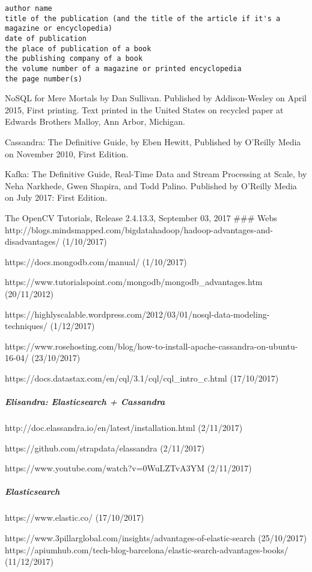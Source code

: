 \documentclass[]{article}
\let\oldsubparagraph\subparagraph
\renewcommand{\subparagraph}[1]{\oldsubparagraph{#1}\mbox{}}
\begin{document}
\begin{verbatim}
author name 
title of the publication (and the title of the article if it's a magazine or encyclopedia) 
date of publication 
the place of publication of a book 
the publishing company of a book 
the volume number of a magazine or printed encyclopedia 
the page number(s) 
\end{verbatim}

NoSQL for Mere Mortals by Dan Sullivan. Published by Addison-Wesley on
April 2015, First printing. Text printed in the United States on
recycled paper at Edwards Brothers Malloy, Ann Arbor, Michigan.

Cassandra: The Definitive Guide, by Eben Hewitt, Published by O'Reilly
Media on November 2010, First Edition.

Kafka: The Definitive Guide, Real-Time Data and Stream Processing at
Scale, by Neha Narkhede, Gwen Shapira, and Todd Palino. Published by
O'Reilly Media on July 2017: First Edition.

The OpenCV Tutorials, Release 2.4.13.3, September 03, 2017 \#\#\# Webs
http://blogs.mindsmapped.com/bigdatahadoop/hadoop-advantages-and-disadvantages/
(1/10/2017)

https://docs.mongodb.com/manual/ (1/10/2017)

https://www.tutorialspoint.com/mongodb/mongodb\_advantages.htm
(20/11/2012)

https://highlyscalable.wordpress.com/2012/03/01/nosql-data-modeling-techniques/
(1/12/2017)

https://www.rosehosting.com/blog/how-to-install-apache-cassandra-on-ubuntu-16-04/
(23/10/2017)

https://docs.datastax.com/en/cql/3.1/cql/cql\_intro\_c.html (17/10/2017)

\hypertarget{elisandra-elasticsearch-cassandra}{%
\subparagraph{Elisandra: Elasticsearch +
Cassandra}\label{elisandra-elasticsearch-cassandra}}

http://doc.elassandra.io/en/latest/installation.html (2/11/2017)

https://github.com/strapdata/elassandra (2/11/2017)

https://www.youtube.com/watch?v=0WuLZTvA3YM (2/11/2017)

\hypertarget{elasticsearch-1}{%
\subparagraph{Elasticsearch}\label{elasticsearch-1}}

https://www.elastic.co/ (17/10/2017)

https://www.3pillarglobal.com/insights/advantages-of-elastic-search
(25/10/2017)
https://apiumhub.com/tech-blog-barcelona/elastic-search-advantages-books/
(11/12/2017)
\end{document}
